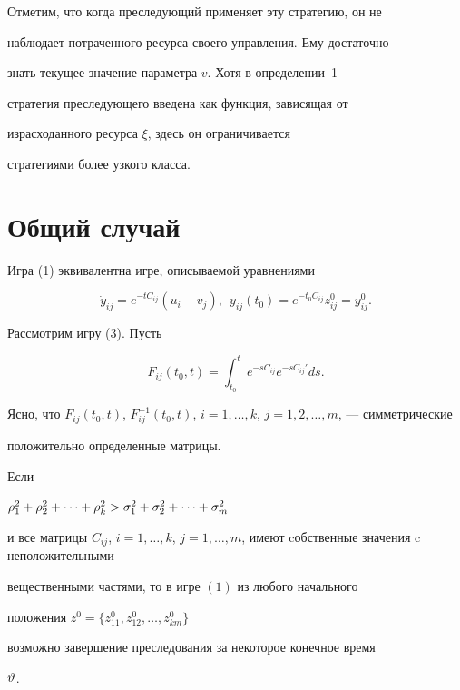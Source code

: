 Отметим, что когда преследующий применяет эту стратегию, он не


наблюдает потраченного ресурса своего управления. Ему достаточно


знать текущее значение параметра $v$. Хотя в определении~1


стратегия преследующего введена как функция, зависящая от


израсходанного ресурса $\xi$, здесь он ограничивается 


стратегиями более узкого класса. 








\section{Общий случай}





Игра (1) эквивалентна игре, описываемой уравнениями


\begin{equation}


\Dot y_{ij} = e^{-tC_{ij}}(u_i - v_j), \ \  y_{ij}(t_0) =


e^{-t_0C_{ij}}z_{ij}^0 = y_{ij}^0.


\end{equation}





Рассмотрим игру (3). Пусть


$$


F_{ij}(t_0, t) = \int_{t_0}^{t}e^{-sC_{ij}}


e^{-sC_{ij}'}ds.


$$





Ясно, что $F_{ij}(t_0, t)$, $F_{ij}^{-1}(t_0,


t)$, $i = 1, \dotsc, k$, $j = 1,2,\dotsc,m$, --- симметрические


положительно определенные матрицы.





\begin{thmnonum}


Если


$\rho_1^2 + \rho_2^2 + \dotsb+ \rho_k^2 >


\s_1^2 + \s_2^2 + \dotsb + \s_m^2 $ 


и все матрицы $C_{ij}$, $i = 1, \dotsc, k$, $j =


1, \dotsc, m$, имеют cобственные значения c неположительными


вещественными частями, то в игре $(1)$ из любого начального


положения $z^0= \{ z_{11}^0, z_{12}^0, \dotsc, z_{km}^0 \} $ 


возможно завершение преследования за некоторое конечное время


$\vartheta $.


\end{thmnonum}





